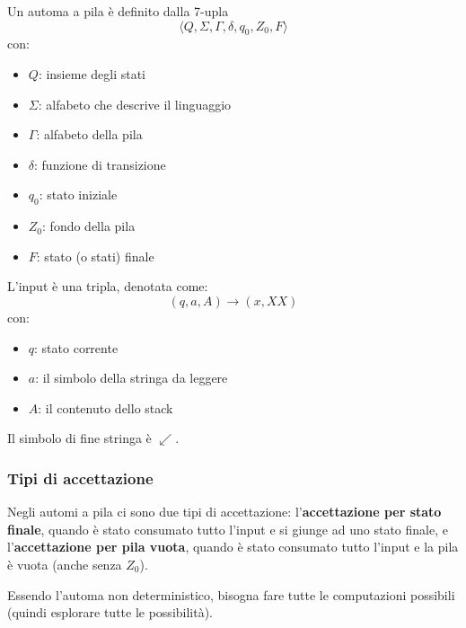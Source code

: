 \documentclass[11pt]{article}
\begin{document}
Un automa a pila è definito dalla 7-upla 
\begin{equation*}
    \langle Q,\Sigma,\Gamma,\delta,q_0,Z_0,F \rangle
\end{equation*}
con:
\begin{itemize}
    \item $Q$: insieme degli stati
    \item $\Sigma$: alfabeto che descrive il linguaggio
    \item $\Gamma$: alfabeto della pila 
    \item $\delta$: funzione di transizione
    \item $q_0$: stato iniziale 
    \item $Z_0$: fondo della pila 
    \item $F$: stato (o stati) finale
\end{itemize}
L'input è una tripla, denotata come:
\begin{equation*}
    (q,a,A)\rightarrow(x,XX)
\end{equation*}
con:
\begin{itemize}
    \item $q$: stato corrente
    \item $a$: il simbolo della stringa da leggere
    \item $A$: il contenuto dello stack
\end{itemize}
Il simbolo di fine stringa è $\swarrow$.
\subsubsection{Tipi di accettazione}
Negli automi a pila ci sono due tipi di accettazione: l'\textbf{accettazione per stato finale}, quando è stato consumato 
tutto l'input e si giunge ad uno stato finale, e l'\textbf{accettazione per pila vuota}, quando è stato consumato tutto 
l'input e la pila è vuota (anche senza $Z_0$).

Essendo l'automa non deterministico, bisogna fare tutte le computazioni possibili (quindi esplorare tutte le possibilità).
\end{document}
